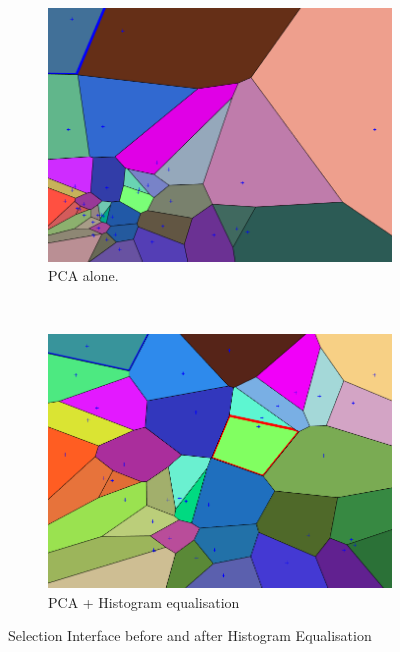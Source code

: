 \documentclass[11pt, oneside]{report}   	%
\begin{document}
\begin{figure}
	\centering
	\begin{subfigure}[b]{0.45\textwidth}
		\includegraphics[width=\textwidth]{PCAInterfaceHistEqBefore.png}
		\caption{PCA alone.}
		\label{fig:histEqBefore}
	\end{subfigure}
	~ %
	\begin{subfigure}[b]{0.45\textwidth}
		\includegraphics[width=\textwidth]{PCAInterfaceHistEqAfter.png}
		\caption{PCA + Histogram equalisation}
		\label{fig:histEqAfter}
	\end{subfigure}
	\caption{Selection Interface before and after Histogram Equalisation}\label{fig:PCAhistEq}
\end{figure}
\end{document}
